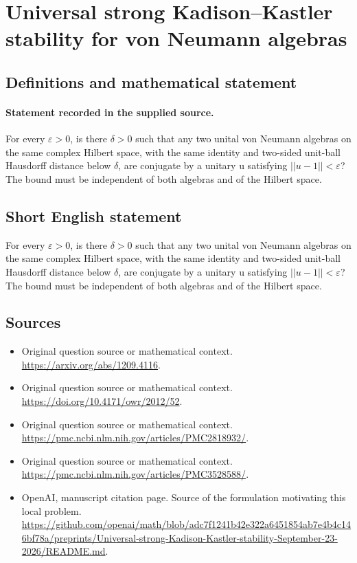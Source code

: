 \documentclass[11pt]{article}
\begin{document}
\section*{Universal strong Kadison–Kastler stability for von Neumann algebras}\label{statement}
\subsection{Definitions and mathematical statement}
\paragraph{Statement recorded in the supplied source.}
For every $\varepsilon >0$, is there $\delta >0$ such that any two unital von Neumann algebras on the same complex Hilbert space, with the same identity and two-sided unit-ball Hausdorff distance below $\delta $, are conjugate by a unitary u satisfying $||u-1||<\varepsilon $? The bound must be independent of both algebras and of the Hilbert space.
\subsection{Short English statement}
For every $\varepsilon >0$, is there $\delta >0$ such that any two unital von Neumann algebras on the same complex Hilbert space, with the same identity and two-sided unit-ball Hausdorff distance below $\delta $, are conjugate by a unitary u satisfying $||u-1||<\varepsilon $? The bound must be independent of both algebras and of the Hilbert space.
\subsection{Sources}
\begin{itemize}
\item[S1] Original question source or mathematical context.
\url{https://arxiv.org/abs/1209.4116}.
\item[S2] Original question source or mathematical context.
\url{https://doi.org/10.4171/owr/2012/52}.
\item[S3] Original question source or mathematical context.
\url{https://pmc.ncbi.nlm.nih.gov/articles/PMC2818932/}.
\item[S4] Original question source or mathematical context.
\url{https://pmc.ncbi.nlm.nih.gov/articles/PMC3528588/}.
\item[S5] OpenAI, manuscript citation page. Source of the formulation motivating this local problem.
\url{https://github.com/openai/math/blob/adc7f1241b42e322a6451854ab7e4b4c146bf78a/preprints/Universal-strong-Kadison-Kastler-stability-September-23-2026/README.md}.
\end{itemize}
\end{document}
